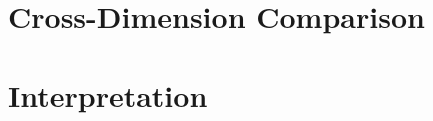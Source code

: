 \section{Cross-Dimension Comparison}
\label{sec:crossdim}

\section{Interpretation}
\label{sec:mn-interp}
